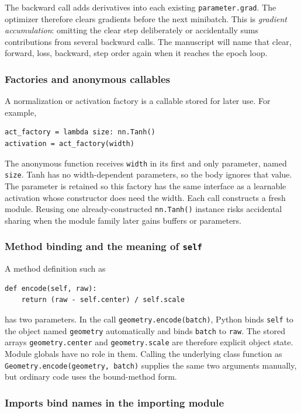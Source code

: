\documentclass[10pt,aps,prd,twocolumn,nofootinbib]{revtex4-2}
\newcommand{\code}[1]{\texttt{#1}}
\begin{document}
The backward call adds derivatives into each existing
\code{parameter.grad}.  The optimizer therefore clears gradients before the
next minibatch.  This is
\emph{gradient accumulation}: omitting the clear step deliberately or
accidentally sums contributions from several backward calls.  The manuscript
will name that clear, forward, loss, backward, step order again when it reaches
the epoch loop.

\subsubsection{Factories and anonymous callables}

A normalization or activation factory is a callable stored for later use.
For example,
\begin{verbatim}
act_factory = lambda size: nn.Tanh()
activation = act_factory(width)
\end{verbatim}
The anonymous function receives \code{width} in its first and only parameter,
named \code{size}.  Tanh has no width-dependent parameters, so the body ignores
that value.  The parameter is retained so this factory has the same
interface as a learnable activation whose constructor does need the width.
Each call constructs a fresh module.  Reusing one already-constructed
\code{nn.Tanh()} instance risks accidental sharing when the module family
later gains buffers or parameters.

\subsubsection{Method binding and the meaning of \code{self}}

A method definition such as
\begin{verbatim}
def encode(self, raw):
    return (raw - self.center) / self.scale
\end{verbatim}
has two parameters.  In the call \code{geometry.encode(batch)}, Python binds
\code{self} to the object named \code{geometry} automatically and binds
\code{batch} to \code{raw}.  The stored arrays
\code{geometry.center} and \code{geometry.scale} are therefore explicit object
state.  Module globals have no role in them.  Calling the underlying class function as
\code{Geometry.encode(geometry, batch)} supplies the same two arguments
manually, but ordinary code uses the bound-method form.

\subsubsection{Imports bind names in the importing module}
\end{document}
